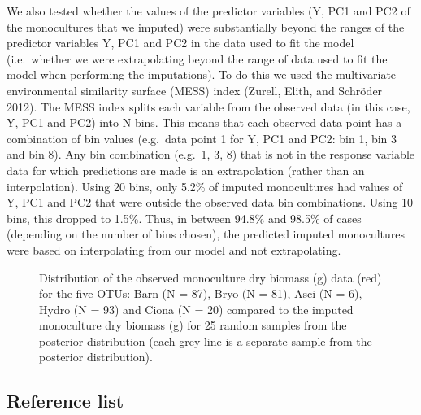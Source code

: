 \documentclass[
  letterpaper,
  DIV=11,
  numbers=noendperiod]{scrartcl}
\begin{document}
We also tested whether the values of the predictor variables (Y, PC1 and
PC2 of the monocultures that we imputed) were substantially beyond the
ranges of the predictor variables Y, PC1 and PC2 in the data used to fit
the model (i.e.~whether we were extrapolating beyond the range of data
used to fit the model when performing the imputations). To do this we
used the multivariate environmental similarity surface (MESS) index
(Zurell, Elith, and Schröder 2012). The MESS index splits each variable
from the observed data (in this case, Y, PC1 and PC2) into N bins. This
means that each observed data point has a combination of bin values
(e.g.~data point 1 for Y, PC1 and PC2: bin 1, bin 3 and bin 8). Any bin
combination (e.g.~1, 3, 8) that is not in the response variable data for
which predictions are made is an extrapolation (rather than an
interpolation). Using 20 bins, only 5.2\% of imputed monocultures had
values of Y, PC1 and PC2 that were outside the observed data bin
combinations. Using 10 bins, this dropped to 1.5\%. Thus, in between
94.8\% and 98.5\% of cases (depending on the number of bins chosen), the
predicted imputed monocultures were based on interpolating from our
model and not extrapolating.

\begin{figure}


\caption{\label{fig-s18}Distribution of the observed monoculture dry
biomass (g) data (red) for the five OTUs: Barn (N = 87), Bryo (N = 81),
Asci (N = 6), Hydro (N = 93) and Ciona (N = 20) compared to the imputed
monoculture dry biomass (g) for 25 random samples from the posterior
distribution (each grey line is a separate sample from the posterior
distribution).}

\end{figure}%

\newpage{}

\subsection{Reference list}\label{reference-list}
\end{document}
